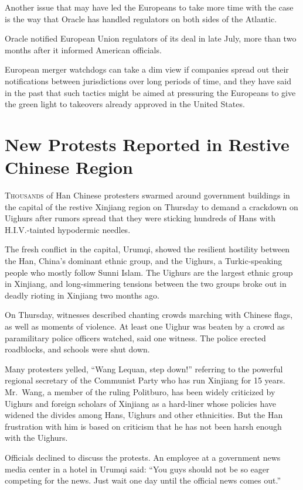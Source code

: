 ﻿\documentclass[12pt]{article}
\begin{document}
Another issue that may have led the Europeans to take more time with the case is the way that Oracle
has handled regulators on both sides of the Atlantic.

Oracle notified European Union regulators of its deal in late July, more than two months after it
informed American officials.

European merger watchdogs can take a dim view if companies spread out their notifications between
jurisdictions over long periods of time, and they have said in the past that such tactics might be
aimed at pressuring the Europeans to give the green light to takeovers already approved in the
United States.

\section{New Protests Reported in Restive Chinese Region}

\lettrine{T}{housands} of Han Chinese protesters swarmed around government buildings in the capital
of the restive Xinjiang region on Thursday to demand a crackdown on Uighurs after rumors spread that
they were sticking hundreds of Hans with H.I.V.-tainted hypodermic needles.

The fresh conflict in the capital, Urumqi, showed the resilient hostility between the Han, China's
dominant ethnic group, and the Uighurs, a Turkic-speaking people who mostly follow Sunni Islam. The
Uighurs are the largest ethnic group in Xinjiang, and long-simmering tensions between the two groups
broke out in deadly rioting in Xinjiang two months ago.

On Thursday, witnesses described chanting crowds marching with Chinese flags, as well as moments of
violence. At least one Uighur was beaten by a crowd as paramilitary police officers watched, said
one witness. The police erected roadblocks, and schools were shut down.

Many protesters yelled, ``Wang Lequan, step down!'' referring to the powerful regional secretary of
the Communist Party who has run Xinjiang for 15 years. Mr.~Wang, a member of the ruling Politburo,
has been widely criticized by Uighurs and foreign scholars of Xinjiang as a hard-liner whose
policies have widened the divides among Hans, Uighurs and other ethnicities. But the Han frustration
with him is based on criticism that he has not been harsh enough with the Uighurs.

Officials declined to discuss the protests. An employee at a government news media center in a hotel
in Urumqi said: ``You guys should not be so eager competing for the news. Just wait one day until
the official news comes out.''
\end{document}
